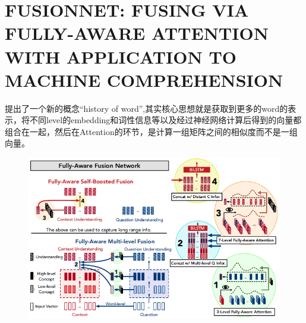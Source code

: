 \documentclass[a4paper,UTF8]{article}
\numberwithin{equation}{section}
\begin{document}
\section{FUSIONNET: FUSING VIA FULLY-AWARE ATTENTION WITH APPLICATION TO MACHINE COMPREHENSION}
提出了一个新的概念“history of word”,其实核心思想就是获取到更多的word的表示，将不同level的embedding和词性信息等以及经过神经网络计算后得到的向量都组合在一起，然后在Attention的环节，是计算一组矩阵之间的相似度而不是一组向量。
\begin{figure}[H]
	\centering
	\includegraphics[width=\textwidth]{5-1.png}
\end{figure}
\end{document}
